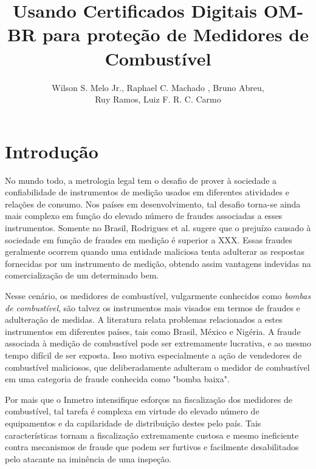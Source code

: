 \documentclass[12pt]{article}
\title{Usando Certificados Digitais OM-BR para proteção de Medidores de Combustível}
\author{
  Wilson S. Melo Jr.\inst{1}, Raphael C. Machado \inst{1}, Bruno Abreu\inst{1},\\ 
  Ruy Ramos\inst{2}, Luiz F. R. C. Carmo\inst{1,3}}
\begin{document}
 

\maketitle

     

\section{Introdução}
No mundo todo, a metrologia legal tem o desafio de prover à sociedade a confiabilidade de instrumentos de medição usados em diferentes atividades e relações de consumo.
Nos países em desenvolvimento, tal desafio torna-se ainda mais complexo em função do elevado número de fraudes associadas a esses instrumentos.
Somente no Brasil, Rodrigues et al. sugere que o prejuízo causado à sociedade em função de fraudes em medição é superior a XXX.
Essas fraudes geralmente ocorrem quando uma entidade maliciosa tenta adulterar as respostas fornecidas por um instrumento de medição, obtendo assim vantagens indevidas na comercialização de um determinado bem.

Nesse cenário, os medidores de combustível, vulgarmente conhecidos como \emph{bombas de combustível}, são talvez os instrumentos mais visados em termos de fraudes e adulteração de medidas.
A literatura relata problemas relacionados a estes instrumentos em diferentes países, tais como Brasil, México e Nigéria.
A fraude associada à medição de combustível pode ser extremamente lucrativa, e ao mesmo tempo difícil de ser exposta.
Isso motiva especialmente a ação de vendedores de combustível maliciosos, que deliberadamente adulteram o medidor de combustível em uma categoria de fraude conhecida como "bomba baixa".

Por mais que o Inmetro intensifique esforços na fiscalização dos medidores de combustível, tal tarefa é complexa em virtude do elevado número de equipamentos e da capilaridade de distribuição destes pelo país.
Tais características tornam a fiscalização extremamente custosa e mesmo ineficiente contra mecanismos de fraude que podem ser furtivos e facilmente desabilitados pelo atacante na iminência de uma inspeção.
\end{document}
